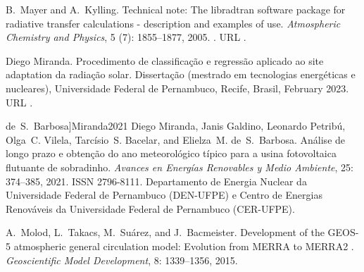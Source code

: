 \documentclass[letterpaper,12pt, twoside]{report}
\providecommand{\DIFdeltex}[1]{{\protect\color{red} \scriptsize #1}} %
\providecommand{\DIFdel}[1]{\texorpdfstring{\DIFdeltex{#1}}{}} %
\begin{document}
\DIFdel{B.~Mayer and A.~Kylling.
}%
\DIFdel{Technical note: The libradtran software package for radiative
  transfer calculations - description and examples of use.
}%
\DIFdel{\emph{Atmospheric Chemistry and Physics}, 5}%
\DIFdel{(7):}%
\DIFdel{1855--1877, 2005.
}%
\DIFdel{.
}%
\DIFdel{URL }%
\DIFdel{.
}%

\DIFdel{Diego Miranda.
}%
\DIFdel{Procedimento de classificação e regressão aplicado ao site
  adaptation da radiação solar.
}%
\DIFdel{Dissertação (mestrado em tecnologias energéticas e nucleares),
  Universidade Federal de Pernambuco, Recife, Brasil, February 2023.
}%
\DIFdel{URL }%
\DIFdel{.
}%

  de~S.~Barbosa]{Miranda2021}
\DIFdel{Diego Miranda, Janis Galdino, Leonardo Petribú, Olga~C. Vilela, Tarcísio~S.
  Bacelar, and Elielza~M. de~S.~Barbosa.
}%
\DIFdel{Análise de longo prazo e obtenção do ano meteorológico típico
  para a usina fotovoltaica flutuante de sobradinho.
}%
\DIFdel{\emph{Avances en Energías Renovables y Medio Ambiente}, 25:}%
\DIFdel{374--385, 2021.
}%
\DIFdel{ISSN 2796-8111.
}%
\DIFdel{Departamento de Energia Nuclear da Universidade Federal de Pernambuco
  (DEN-UFPE) e Centro de Energias Renováveis da Universidade Federal de
  Pernambuco (CER-UFPE).
}%

\DIFdel{A.~Molod, L.~Takacs, M.~Suárez, and J.~Bacmeister.
}%
\DIFdel{Development of the }%
\DIFdel{GEOS-5}%
\DIFdel{atmospheric general circulation model:
  Evolution from }%
\DIFdel{MERRA}%
\DIFdel{to }%
\DIFdel{MERRA2}%
\DIFdel{.
}%
\DIFdel{\emph{Geoscientific Model Development}, 8:}%
\DIFdel{1339--1356, 2015.
}%
\end{document}
